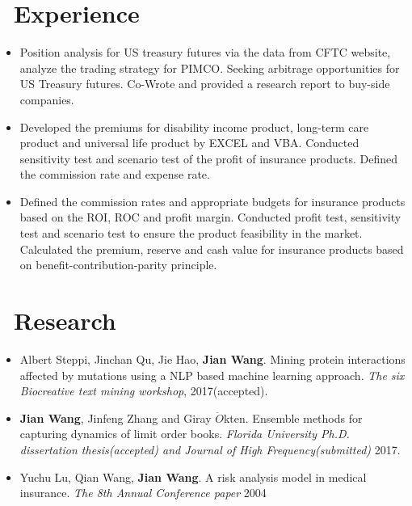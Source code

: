 \documentclass{resume}
\begin{document}
\section{\faGears\ Experience}
\large {}
\begin{itemize}\large
	\item Position analysis for US treasury futures via the data from CFTC website,  analyze the trading strategy for PIMCO. Seeking arbitrage opportunities for US Treasury futures. Co-Wrote and provided a research report to buy-side companies.  
\end{itemize}
\large {}
\begin{itemize}\large
  \item Developed the premiums for disability income product,  long-term care product and universal life product by EXCEL and VBA. Conducted sensitivity test and scenario test of the profit of insurance products. Defined the commission rate and expense rate. 
  
  
\end{itemize}

\large {}
\begin{itemize}\large
  \item Defined the commission rates and appropriate budgets for insurance products based on the ROI,  ROC and profit margin. Conducted profit test,  sensitivity test and scenario test to ensure the product feasibility in the market. Calculated the premium,  reserve and cash value for insurance products based on benefit-contribution-parity principle.
\end{itemize}
\section{\faBook\ Research}

\begin{itemize}[parsep=0.5ex]\large
  \item Albert Steppi, Jinchan Qu, Jie Hao, \textbf{Jian Wang}. Mining protein interactions affected by mutations using a NLP based machine learning approach. \textit{The six Biocreative text mining workshop}, 2017(accepted).
  \item \textbf{Jian Wang}, Jinfeng Zhang and Giray $\ddot{O}$kten. Ensemble methods for capturing dynamics of limit order books. \textit{Florida University Ph.D. dissertation thesis(accepted) and Journal of High Frequency(submitted)} 2017.
  \item Yuchu Lu, Qian Wang, \textbf{Jian Wang}. A risk analysis model in medical insurance. \textit{The 8th Annual Conference paper} 2004 
  
\end{itemize}
    
\end{document}
